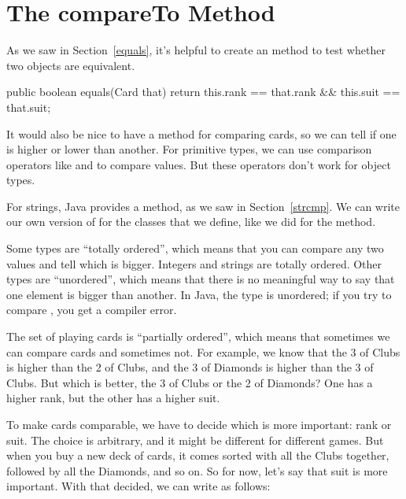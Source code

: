 \section{The compareTo Method}


As we saw in Section~\ref{equals}, it's helpful to create an  method to test whether two objects are equivalent.

\begin{code}
public boolean equals(Card that) {
    return this.rank == that.rank
        && this.suit == that.suit;
}
\end{code}


It would also be nice to have a method for comparing cards, so we can tell if one is higher or lower than another.
For primitive types, we can use comparison operators like \java{<} and \java{>} to compare values.
But these operators don't work for object types.

For strings, Java provides a  method, as we saw in Section~\ref{strcmp}.
We can write our own version of  for the classes that we define, like we did for the  method.


Some types are ``totally ordered'', which means that you can compare any two values and tell which is bigger.
Integers and strings are totally ordered.
Other types are ``unordered'', which means that there is no meaningful way to say that one element is bigger than another.
In Java, the  type is unordered; if you try to compare , you get a compiler error.

The set of playing cards is ``partially ordered'', which means that sometimes we can compare cards and sometimes not.
For example, we know that the 3 of Clubs is higher than the 2 of Clubs, and the 3 of Diamonds is higher than the 3 of Clubs.
But which is better, the 3 of Clubs or the 2 of Diamonds?
One has a higher rank, but the other has a higher suit.


To make cards comparable, we have to decide which is more important: rank or suit.
The choice is arbitrary, and it might be different for different games.
But when you buy a new deck of cards, it comes sorted with all the Clubs together, followed by all the Diamonds, and so on.
So for now, let's say that suit is more important.
With that decided, we can write  as follows:


